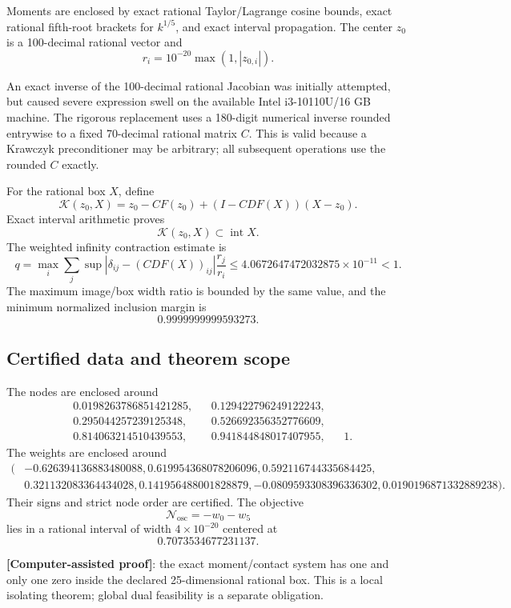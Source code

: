 \documentclass[11pt,a4paper]{article}
\newcommand{\status}[1]{\textbf{[#1]}}
\begin{document}
Moments are enclosed by exact rational Taylor/Lagrange cosine bounds, exact
rational fifth-root brackets for $k^{1/5}$, and exact interval propagation.
The center $z_0$ is a 100-decimal rational vector and
\[
r_i=10^{-20}\max(1,|z_{0,i}|).
\]

An exact inverse of the 100-decimal rational Jacobian was initially attempted,
but caused severe expression swell on the available Intel i3-10110U/16 GB
machine. The rigorous replacement uses a 180-digit numerical inverse rounded
entrywise to a fixed 70-decimal rational matrix $C$. This is valid because a
Krawczyk preconditioner may be arbitrary; all subsequent operations use the
rounded $C$ exactly.

For the rational box $X$, define
\[
\mathcal K(z_0,X)=z_0-CF(z_0)+(I-CDF(X))(X-z_0).
\]
Exact interval arithmetic proves
\[
\mathcal K(z_0,X)\subset\operatorname{int}X.
\]
The weighted infinity contraction estimate is
\[
q=\max_i\sum_j
\sup|\delta_{ij}-(CDF(X))_{ij}|\frac{r_j}{r_i}
\le4.0672647472032875\times10^{-11}<1.
\]
The maximum image/box width ratio is bounded by the same value, and the
minimum normalized inclusion margin is
\[
0.9999999999593273.
\]

\subsection{Certified data and theorem scope}

The nodes are enclosed around
\[
\begin{aligned}
&0.0198263786851421285,&&0.129422796249122243,\\
&0.295044257239125348,&&0.526692356352776609,\\
&0.814063214510439553,&&0.941844848017407955,&&1.
\end{aligned}
\]
The weights are enclosed around
\[
\begin{aligned}
(&-0.626394136883480088,
0.619954368078206096,
0.592116744335684425,\\
&0.321132083364434028,
0.141956488001828879,
-0.0809593308396336302,
0.0190196871332889238).
\end{aligned}
\]
Their signs and strict node order are certified. The objective
\[
\mathcal N_{\mathrm{osc}}=-w_0-w_5
\]
lies in a rational interval of width $4\times10^{-20}$ centered at
\[
0.7073534677231137.
\]

\status{Computer-assisted proof}: the exact moment/contact system has one
and only one zero inside the declared 25-dimensional rational box. This is a
local isolating theorem; global dual feasibility is a separate obligation.
\end{document}
